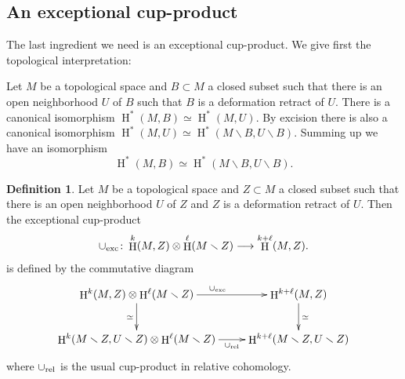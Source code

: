 \documentclass[11pt,a4paper]{amsart}
\DeclareMathOperator{\rH}{H}
\newcommand{\rel}{\text{\rm rel}}
\newcommand{\exc}{\text{\rm exc}}
\numberwithin{equation}{section}
\theoremstyle{plain}
\theoremstyle{definition}
\newtheorem{df}[prop]{Definition}
\begin{document}
 \subsection{An exceptional cup-product}
\label{sec:an-exceptional-cup}
The last ingredient we need is an exceptional cup-product. We give
first the topological interpretation:


Let $M$ be a topological space and $B\subset M$ a closed subset such
that there is an open neighborhood $U$ of $B$ such that $B$ is a
deformation retract of $U$.
There is a canonical isomorphism
$\rH^{\ast}(M,B)\simeq \rH^{\ast}(M,U)$. By excision there is also a
canonical isomorphism
$\rH^{\ast}(M,U)\simeq \rH^{\ast}(M\smallsetminus B,U\smallsetminus
B)$. Summing up we have an isomorphism
\begin{displaymath}
  \rH^{\ast}(M,B)\simeq
  \rH^{\ast}(M\smallsetminus B,U\smallsetminus B). 
\end{displaymath}

\begin{df}\label{def:4} Let $M$ be a topological space and
  $Z\subset M$ a closed subset such that there is an open
  neighborhood $U$ of $Z$ and  $Z$ is a deformation retract of
  $U$. Then the exceptional cup-product
  \begin{displaymath}
    \cup_{\exc}\colon \rH^{k}(M,Z)\otimes \rH^{\ell }(M\smallsetminus Z) \longrightarrow
    \rH^{k+\ell}(M,Z).
  \end{displaymath}
  is defined by the commutative diagram
  \begin{equation}\label{eq:4}
    \xymatrix{
      \rH^{k}(M,Z)\otimes \rH^{\ell }(M\smallsetminus Z) \ar[d]_{\simeq}
      \ar[r]^{\cup_{\exc}} &
    \rH^{k+\ell}(M,Z) \ar[d]^{\simeq}\\
    \rH^{k}(M\smallsetminus Z,U\smallsetminus Z)\otimes \rH^{\ell }(M\smallsetminus
    Z)
    \ar[r]_-{\cup_{\rel}} &
    \rH^{k+\ell}(M\smallsetminus Z,U\smallsetminus Z)
    } 
  \end{equation}
  where $\cup_{\rel}$ is the usual cup-product in relative cohomology.
\end{df}
\end{document}
